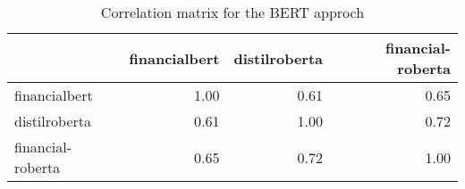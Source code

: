 \begin{table}
\caption{Correlation matrix for the BERT approch}
\label{tab:bert_corr}
\begin{tabular}{lrrr}
\toprule
 & financialbert & distilroberta & financial-roberta \\
\midrule
financialbert & 1.00 & 0.61 & 0.65 \\
distilroberta & 0.61 & 1.00 & 0.72 \\
financial-roberta & 0.65 & 0.72 & 1.00 \\
\bottomrule
\end{tabular}
\end{table}
